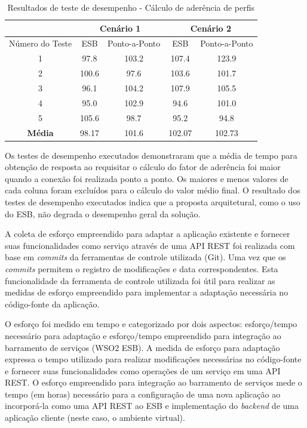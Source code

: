 \begin{table}[!htbp]
\centering
\caption{Resultados de teste de desempenho - Cálculo de aderência de perfis}
\label{resultado_desempenho}
\begin{tabular}{*5c}
\toprule
  & \multicolumn{2}{c}{Cenário 1} & \multicolumn{2}{c}{Cenário 2} \\ 
\midrule
Número do Teste               & ESB   & Ponto-a-Ponto & ESB    & Ponto-a-Ponto \\
1                            & 97.8  &    103.2      & 107.4  &  123.9   \\
2                            & 100.6 &     97.6      & 103.6  &  101.7   \\
3                            & 96.1  &    104.2      & 107.9  &  105.5   \\ 
4                            & 95.0  &    102.9      &  94.6  &  101.0   \\ 
5                            & 105.6 &     98.7      &  95.2  &   94.8   \\ 
\midrule
\textbf{Média}               & 98.17 &    101.6      & 102.07 &  102.73   \\ 
\bottomrule
\end{tabular}
\end{table}

Os testes de desempenho executados demonstraram que a média de tempo para obtenção de resposta ao requisitar o cálculo do fator de aderência foi maior quando a conexão foi realizada ponto a ponto. Os maiores e menos valores de cada coluna foram excluídos para o cálculo do valor médio final. O resultado dos testes de desempenho executados indica que a proposta arquitetural, como o uso do ESB, não degrada o desempenho geral da solução.

A coleta de esforço empreendido para adaptar a aplicação existente e fornecer suas funcionalidades como serviço através de uma API REST foi realizada com base em \textit{commits} da ferramentas de controle utilizada (Git). Uma vez que os \textit{commits} permitem o registro de modificações e data correspondentes. Esta funcionalidade da ferramenta de controle utilizada foi útil para realizar as medidas de esforço empreendido para implementar a adaptação necessária no código-fonte da aplicação.

O esforço foi medido em tempo e categorizado por dois aspectos: esforço/tempo necessário para adaptação e esforço/tempo empreendido para integração ao barramento de serviços (WSO2 ESB). A medida de esforço para adaptação expressa o tempo utilizado para realizar modificações necessárias no código-fonte e fornecer suas funcionalidades como operações de um serviço em uma API REST. O esforço empreendido para integração ao barramento de serviços mede o tempo (em horas) necessário para a configuração de uma nova aplicação ao incorporá-la como uma API REST ao ESB e implementação do \textit{backend} de uma aplicação cliente (neste caso, o ambiente virtual).

